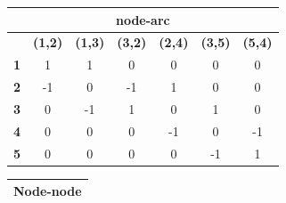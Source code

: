\documentclass{report}
\begin{document}
\begin{enumerate}[2.1]
\begin{table}[ht]
        \centering
        \begin{tabular}{|ccccccc|}
        \hline
        \multicolumn{7}{|c|}{\textbf{node-arc}}                                                                                                                                                                                                         \\ \hline
        \multicolumn{1}{|c|}{}           & \multicolumn{1}{c|}{\textbf{(1,2)}} & \multicolumn{1}{c|}{\textbf{(1,3)}} & \multicolumn{1}{c|}{\textbf{(3,2)}} & \multicolumn{1}{c|}{\textbf{(2,4)}} & \multicolumn{1}{c|}{\textbf{(3,5)}} & \textbf{(5,4)} \\ \hline
        \multicolumn{1}{|c|}{\textbf{1}} & \multicolumn{1}{c|}{1}              & \multicolumn{1}{c|}{1}              & \multicolumn{1}{c|}{0}              & \multicolumn{1}{c|}{0}              & \multicolumn{1}{c|}{0}              & 0              \\ \hline
        \multicolumn{1}{|c|}{\textbf{2}} & \multicolumn{1}{c|}{-1}             & \multicolumn{1}{c|}{0}              & \multicolumn{1}{c|}{-1}             & \multicolumn{1}{c|}{1}              & \multicolumn{1}{c|}{0}              & 0              \\ \hline
        \multicolumn{1}{|c|}{\textbf{3}} & \multicolumn{1}{c|}{0}              & \multicolumn{1}{c|}{-1}             & \multicolumn{1}{c|}{1}              & \multicolumn{1}{c|}{0}              & \multicolumn{1}{c|}{1}              & 0              \\ \hline
        \multicolumn{1}{|c|}{\textbf{4}} & \multicolumn{1}{c|}{0}              & \multicolumn{1}{c|}{0}              & \multicolumn{1}{c|}{0}              & \multicolumn{1}{c|}{-1}             & \multicolumn{1}{c|}{0}              & -1             \\ \hline
        \multicolumn{1}{|c|}{\textbf{5}} & \multicolumn{1}{c|}{0}              & \multicolumn{1}{c|}{0}              & \multicolumn{1}{c|}{0}              & \multicolumn{1}{c|}{0}              & \multicolumn{1}{c|}{-1}             & 1              \\ \hline
        \end{tabular}
        \end{table}
        \begin{table}[ht]
            \centering
            \begin{tabular}{|llllll|}
            \hline
            \multicolumn{6}{|c|}{\textbf{Node-node}}                                                                                                                                                       \\ \hline

\end{tabular}
\end{table}
\end{enumerate}
\end{document}
